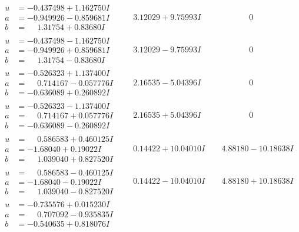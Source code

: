 \documentclass[1p]{elsarticle_modified}
\theoremstyle{definition}
\begin{document}
$$\begin{array}{c|c|c}
\begin{aligned}
u &= -0.437498 + 1.162750 I \\
a &= -0.949926 - 0.859681 I \\
b &= \phantom{-}1.31754 + 0.83680 I\end{aligned}
 & \phantom{-}3.12029 + 9.75993 I & \phantom{-0.000000 } 0 \\ \hline\begin{aligned}
u &= -0.437498 - 1.162750 I \\
a &= -0.949926 + 0.859681 I \\
b &= \phantom{-}1.31754 - 0.83680 I\end{aligned}
 & \phantom{-}3.12029 - 9.75993 I & \phantom{-0.000000 } 0 \\ \hline\begin{aligned}
u &= -0.526323 + 1.137400 I \\
a &= \phantom{-}0.714167 - 0.057776 I \\
b &= -0.636089 + 0.260892 I\end{aligned}
 & \phantom{-}2.16535 - 5.04396 I & \phantom{-0.000000 } 0 \\ \hline\begin{aligned}
u &= -0.526323 - 1.137400 I \\
a &= \phantom{-}0.714167 + 0.057776 I \\
b &= -0.636089 - 0.260892 I\end{aligned}
 & \phantom{-}2.16535 + 5.04396 I & \phantom{-0.000000 } 0 \\ \hline\begin{aligned}
u &= \phantom{-}0.586583 + 0.460125 I \\
a &= -1.68040 + 0.19022 I \\
b &= \phantom{-}1.039040 + 0.827520 I\end{aligned}
 & \phantom{-}0.14422 + 10.04010 I & \phantom{-}4.88180 - 10.18638 I \\ \hline\begin{aligned}
u &= \phantom{-}0.586583 - 0.460125 I \\
a &= -1.68040 - 0.19022 I \\
b &= \phantom{-}1.039040 - 0.827520 I\end{aligned}
 & \phantom{-}0.14422 - 10.04010 I & \phantom{-}4.88180 + 10.18638 I \\ \hline\begin{aligned}
u &= -0.735576 + 0.015230 I \\
a &= \phantom{-}0.707092 - 0.935835 I \\
b &= -0.540635 + 0.818076 I\end{aligned}

\end{array}$$
\end{document}
